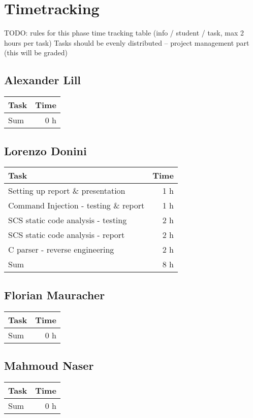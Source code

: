 \chapter{Timetracking}\label{chapter:timetracking}

TODO: rules for this phase\newline
time tracking table (info / student / task, max 2 hours per task)
Tasks should be evenly distributed – project management part (this will be graded)\newline

\section*{Alexander Lill}
\begin{table}[h!tpb]
  \centering
  \begin{tabularx}{\textwidth}{X r}
    \toprule
      Task & Time \\
    \midrule
    \midrule
      Sum & 0 h \\
    \bottomrule
  \end{tabularx}
\end{table}

\clearpage
\section*{Lorenzo Donini}
\begin{table}[h!tpb]
  \centering
  \begin{tabularx}{\textwidth}{X r}
    \toprule
      Task & Time \\
    \midrule
      Setting up report \& presentation & 1 h \\
      Command Injection - testing \& report & 1 h \\
      SCS static code analysis - testing & 2 h \\
      SCS static code analysis - report & 2 h \\
      C parser - reverse engineering & 2 h \\
    \midrule
      Sum & 8 h \\
    \bottomrule
  \end{tabularx}
\end{table}

\clearpage
\section*{Florian Mauracher}
\begin{table}[h!tpb]
  \centering
  \begin{tabularx}{\textwidth}{X r}
    \toprule
      Task & Time \\
    \midrule
    \midrule
      Sum & 0 h \\
    \bottomrule
  \end{tabularx}
\end{table}

\clearpage
\section*{Mahmoud Naser}
\begin{table}[h!tpb]
  \centering
  \begin{tabularx}{\textwidth}{X r}
    \toprule
      Task & Time \\
    \midrule
    \midrule
      Sum & 0 h \\
    \bottomrule
  \end{tabularx}
\end{table}
